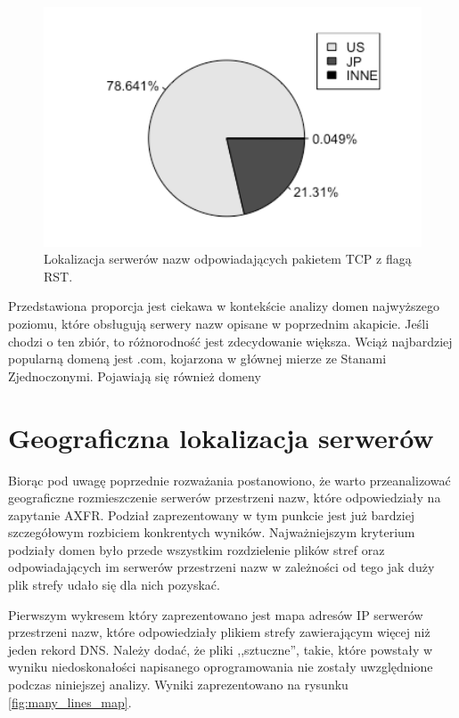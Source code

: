 \begin{figure}[ht]
\centering
\includegraphics[width=1.0\textwidth]{image/unused_pie_no_title}
\caption{Lokalizacja serwerów nazw odpowiadających pakietem TCP z flagą RST.}
\label{fig:unused_pie}
\end{figure}

Przedstawiona proporcja jest ciekawa w kontekście analizy domen najwyższego poziomu, które obsługują serwery nazw opisane
w poprzednim akapicie. Jeśli chodzi o ten zbiór, to różnorodność jest zdecydowanie większa. Wciąż najbardziej popularną domeną
jest .com, kojarzona w głównej mierze ze Stanami Zjednoczonymi. Pojawiają się również domeny

\section{Geograficzna lokalizacja serwerów}
Biorąc pod uwagę poprzednie rozważania postanowiono, że warto przeanalizować geograficzne rozmieszczenie serwerów przestrzeni nazw,
które odpowiedziały na zapytanie AXFR. Podział zaprezentowany w tym punkcie jest już bardziej szczegółowym rozbiciem konkrentych
wyników. Najważniejszym kryterium podziały domen było przede wszystkim rozdzielenie plików stref oraz odpowiadających im serwerów
przestrzeni nazw w zależności od tego jak duży plik strefy udało się dla nich pozyskać.

Pierwszym wykresem który zaprezentowano jest mapa adresów IP serwerów przestrzeni nazw, które odpowiedziały plikiem strefy zawierającym
więcej niż jeden rekord DNS. Należy dodać, że pliki ,,sztuczne'', takie, które powstały w wyniku niedoskonałości napisanego oprogramowania
nie zostały uwzględnione podczas niniejszej analizy. Wyniki zaprezentowano na rysunku \ref{fig:many_lines_map}.


